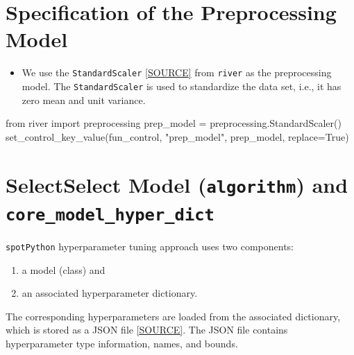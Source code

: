 \documentclass[
  letterpaper,
  DIV=11,
  numbers=noendperiod]{scrreprt}
\newenvironment{Shaded}{\begin{snugshade}}{\end{snugshade}}
\newcommand{\ImportTok}[1]{\textcolor[rgb]{0.00,0.46,0.62}{#1}}
\newcommand{\NormalTok}[1]{\textcolor[rgb]{0.00,0.23,0.31}{#1}}
\newcommand{\OperatorTok}[1]{\textcolor[rgb]{0.37,0.37,0.37}{#1}}
\newcommand{\StringTok}[1]{\textcolor[rgb]{0.13,0.47,0.30}{#1}}
\newcommand{\VariableTok}[1]{\textcolor[rgb]{0.07,0.07,0.07}{#1}}
\providecommand{\tightlist}{%
  \setlength{\itemsep}{0pt}\setlength{\parskip}{0pt}}\usepackage{longtable,booktabs,array}
\begin{document}
\section{Specification of the Preprocessing
Model}\label{specification-of-the-preprocessing-model}

\begin{itemize}
\tightlist
\item
  We use the \texttt{StandardScaler}
  \href{https://riverml.xyz/dev/api/preprocessing/StandardScaler/}{{[}SOURCE{]}}
  from \texttt{river} as the preprocessing model. The
  \texttt{StandardScaler} is used to standardize the data set, i.e., it
  has zero mean and unit variance.
\end{itemize}

\begin{Shaded}
\begin{Highlighting}[]
\ImportTok{from}\NormalTok{ river }\ImportTok{import}\NormalTok{ preprocessing}
\NormalTok{prep\_model }\OperatorTok{=}\NormalTok{ preprocessing.StandardScaler()}
\NormalTok{set\_control\_key\_value(fun\_control, }\StringTok{"prep\_model"}\NormalTok{, prep\_model, replace}\OperatorTok{=}\VariableTok{True}\NormalTok{)}
\end{Highlighting}
\end{Shaded}

\section{\texorpdfstring{SelectSelect Model (\texttt{algorithm}) and
\texttt{core\_model\_hyper\_dict}}{SelectSelect Model (algorithm) and core\_model\_hyper\_dict}}\label{selectselect-model-algorithm-and-core_model_hyper_dict}

\texttt{spotPython} hyperparameter tuning approach uses two components:

\begin{enumerate}
\def\labelenumi{\arabic{enumi}.}
\tightlist
\item
  a model (class) and
\item
  an associated hyperparameter dictionary.
\end{enumerate}

The corresponding hyperparameters are loaded from the associated
dictionary, which is stored as a JSON file
\href{https://github.com/sequential-parameter-optimization/spotRiver/blob/main/src/spotRiver/data/river_hyper_dict.json}{{[}SOURCE{]}}.
The JSON file contains hyperparameter type information, names, and
bounds.
\end{document}
